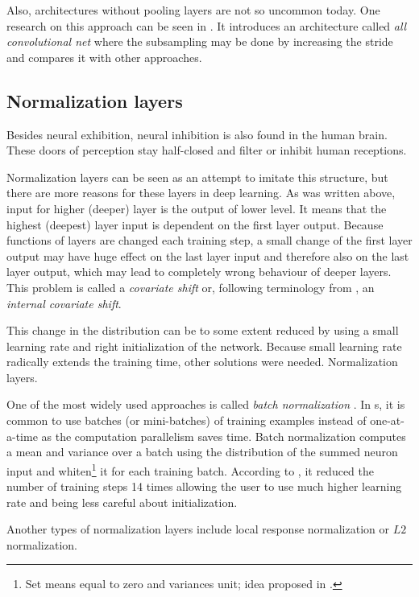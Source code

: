 Also, architectures without pooling layers are not so uncommon today. One research on this approach can be seen in \cite{all-conv-net}. It introduces an architecture called \textit{all convolutional net} where the subsampling may be done by increasing the stride and compares it with other approaches. 

\subsection{Normalization layers}
\label{norm-layers}

Besides neural exhibition, neural inhibition is also found in the human brain. These doors of perception stay half-closed and filter or inhibit human receptions.

Normalization layers can be seen as an attempt to imitate this structure, but there are more reasons for these layers in deep learning. As was written above, input for higher (deeper) layer is the output of lower level. It means that the highest (deepest) layer input is dependent on the first layer output. Because functions of layers are changed each training step, a small change of the first layer output may have huge effect on the last layer input and therefore also on the last layer output, which may lead to completely wrong behaviour of deeper layers. This problem is called a \textit{covariate shift} or, following terminology from \cite{batch-norm}, an \textit{internal covariate shift}. 

This change in the distribution can be to some extent reduced by using a small learning rate and right initialization of the network. Because small learning rate radically extends the training time, other solutions were needed. Normalization layers. 

One of the most widely used approaches is called \textit{batch normalization} \cite{batch-norm}. In s, it is common to use batches (or mini-batches) of training examples instead of one-at-a-time as the computation parallelism saves time. Batch normalization computes a mean and variance over a batch using the distribution of the summed neuron input and whiten\footnote{Set means equal to zero and variances unit; idea proposed in \cite{tricks}.} it for each training batch. According to \cite{batch-norm}, it reduced the number of training steps 14 times allowing the user to use much higher learning rate and being less careful about initialization.

Another types of normalization layers include local response normalization or $L2$ normalization.


